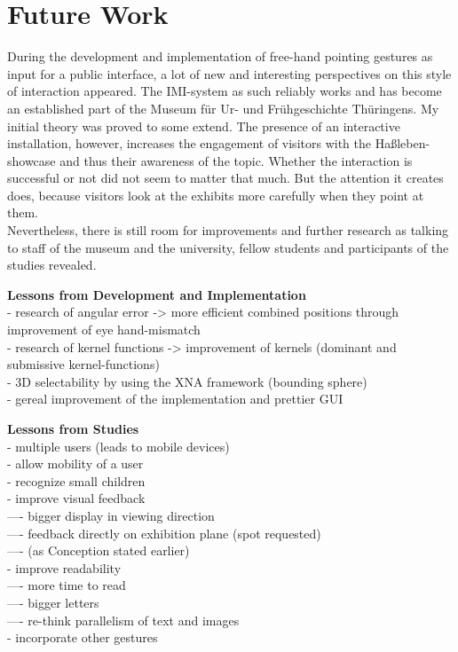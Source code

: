 \chapter{Future Work}
\label{future_work}

During the development and implementation of free-hand pointing gestures as input for a public interface, a lot of new and interesting perspectives on this style of interaction appeared. The \ac{IMI}-system as such reliably works and has become an established part of the Museum für Ur- und Frühgeschichte Thüringens. My initial theory was proved to some extend. The presence of an interactive installation, however, increases the engagement of visitors with the Haßleben-showcase and thus their awareness of the topic. Whether the interaction is successful or not did not seem to matter that much. But the attention it creates does, because visitors look at the exhibits more carefully when they point at them. 
\\
Nevertheless, there is still room for improvements and further research as talking to staff of the museum and the university, fellow students and participants of the studies revealed. 

\textbf{Lessons from Development and Implementation}
\\- research of angular error -> more efficient combined positions through improvement of eye hand-mismatch
\\- research of kernel functions -> improvement of kernels (dominant and submissive kernel-functions)  
\\- 3D selectability by using the XNA framework (bounding sphere)
\\- gereal improvement of the implementation and prettier \ac{GUI}

\textbf{Lessons from Studies}
\\- multiple users (leads to mobile devices)
\\- allow mobility of a user
\\- recognize small children
\\- improve visual feedback 
\\---- bigger display in viewing direction
\\---- feedback directly on exhibition plane (spot requested) 
\\---- (as Conception stated earlier)
\\- improve readability
\\---- more time to read
\\---- bigger letters
\\---- re-think parallelism of text and images
\\- incorporate other gestures

